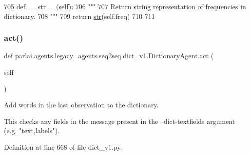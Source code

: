 \begin{DoxyCode}
705     \textcolor{keyword}{def }\_\_str\_\_(self):
706         \textcolor{stringliteral}{"""}
707 \textcolor{stringliteral}{        Return string representation of frequencies in dictionary.}
708 \textcolor{stringliteral}{        """}
709         \textcolor{keywordflow}{return} \hyperlink{namespacegenerate__task__READMEs_a5b88452ffb87b78c8c85ececebafc09f}{str}(self.freq)
710 
711 
\end{DoxyCode}
\mbox{\label{classparlai_1_1agents_1_1legacy__agents_1_1seq2seq_1_1dict__v1_1_1DictionaryAgent_a46c77fca1e6062b363ed8ee402d46986}} 
\subsubsection{\texorpdfstring{act()}{act()}}
{\footnotesize\ttfamily def parlai.\+agents.\+legacy\+\_\+agents.\+seq2seq.\+dict\+\_\+v1.\+Dictionary\+Agent.\+act (\begin{DoxyParamCaption}\item[{}]{self }\end{DoxyParamCaption})}

\begin{DoxyVerb}Add words in the last observation to the dictionary.

This checks any fields in the message present in the --dict-textfields argument
(e.g. "text,labels").
\end{DoxyVerb}
 

Definition at line 668 of file dict\+\_\+v1.\+py.


